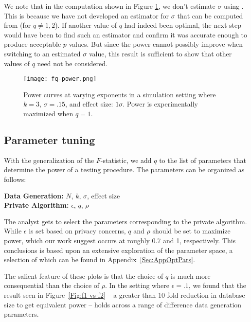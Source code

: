 We note that in the computation shown in Figure \ref{fig:fqpower}, we don't estimate $\sigma$ using \sqe.  This is because we have not developed an estimator for $\sigma$ that can be computed from \sqe (for $q \ne 1, 2$).  If another value of $q$ had indeed been optimal, the next step would have been to find such an estimator and confirm it was accurate enough to produce acceptable $p$-values.  But since the power cannot possibly improve when switching to an estimated $\sigma$ value, this result is sufficient to show that other values of $q$ need not be considered.


\begin{figure}
\centering
\texttt{[image: fq-power.png]}
\caption{Power curves at varying exponents in a simulation setting where $k = 3$, $\sigma = .15$, and effect size: $1\sigma$. Power is experimentally maximized when $q = 1$.}\label{fig:fqpower}
\end{figure}



\subsection{Parameter tuning}\label{subsec:params}

With the generalization of the $F$-statistic, we add $q$ to the list of parameters that determine the power of a testing procedure. The parameters can be organized as follows:

\vspace{3mm}
\textbf{Data Generation:} $N$, $k$, $\sigma$, effect size \\
\indent\textbf{Private Algorithm:} $\epsilon$, $q$, $\rho$
\vspace{3mm}

The analyst gets to select the parameters corresponding to the private algorithm. While
$\epsilon$ is set based on privacy concerns, $q$ and $\rho$ should be set to 
maximize power, which our work suggest occurs at roughly 0.7 and 1, respectively.
This conclusions is based upon an extensive exploration of the parameter space, 
a selection of which can be found in Appendix~\ref{Sec:AppOptPars}.

The salient feature of these plots is that the choice of $q$ is much more 
consequential than the choice of $\rho$. In the setting where $\epsilon = .1$, 
we found that the result seen in Figure~\ref{Fig:f1-vs-f2} -- a greater than 
10-fold reduction in database size to get equivalent power -- holds across a range
of difference data generation parameters.


